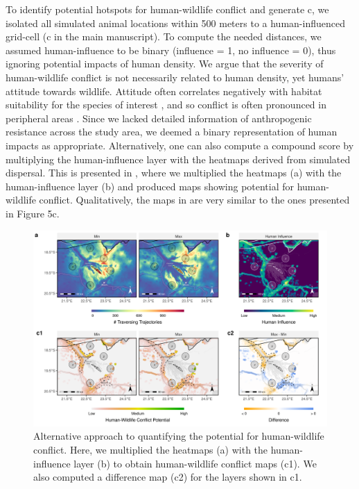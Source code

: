 \documentclass[../FinalThesis.tex]{subfiles}
\begin{document}
To identify potential hotspots for human-wildlife conflict and generate
c, we isolated all simulated animal locations within 500 meters to
a human-influenced grid-cell (c in the main manuscript). To
compute the needed distances, we assumed human-influence to be binary (influence
= 1, no influence = 0), thus ignoring potential impacts of human density. We
argue that the severity of human-wildlife conflict is not necessarily related to
human density, yet humans' attitude towards wildlife. Attitude often correlates
negatively with habitat suitability for the species of interest
\citep{Behr.2017}, and so conflict is often pronounced in peripheral areas
\citep{McNutt.2017}. Since we lacked detailed information of anthropogenic
resistance \citep{Ghoddousi.2021} across the study area, we deemed a binary
representation of human impacts as appropriate. Alternatively, one can also
compute a compound score by multiplying the human-influence layer with the
heatmaps derived from simulated dispersal. This is presented in
, where we multiplied the heatmaps (a)
with the human-influence layer (b) and produced maps
showing potential for human-wildlife conflict. Qualitatively, the maps in
 are very similar to the ones presented in Figure 5c.

\begin{figure}[!ht]
  \begin{center}
  \includegraphics[width =
  \textwidth]{Figures/HumanWildlifeConflictAlternative.png} \caption{Alternative
  approach to quantifying the potential for human-wildlife conflict. Here, we
  multiplied the heatmaps (a) with the human-influence layer (b) to obtain
  human-wildlife conflict maps (c1). We also computed a difference map (c2) for
  the layers shown in c1.}
  \label{HWCAlternative}
  \end{center}
\end{figure}

\end{document}
